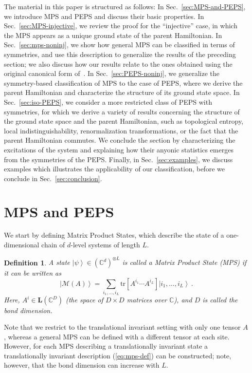 \documentclass{article}
\newcommand{\ket}[1]{\left|#1\right\rangle}
\newcommand{\tr}{\mathrm{tr}}
\newcommand{\lin}[1]{{\bm L}(\mathbb C^{#1})}
\theoremstyle{plain}
\newtheorem{definition}[lemma]{Definition}
\theoremstyle{definition}
\numberwithin{equation}{section}  %
\begin{document}
The material in this paper is structured as follows: In
Sec.~\ref{sec:MPS-and-PEPS}, we introduce MPS and PEPS and discuss their
basic properties. In Sec.~\ref{sec:MPS-injective}, we review the proof for
the ``injective'' case, in which the MPS appears as a unique ground state
of the parent Hamiltonian.  In Sec.~\ref{sec:mps-noninj}, we show how
general MPS can be classified in terms of symmetries, and use this
description to generalize the results of the preceding section; we also
discuss how our results relate to the ones obtained using the
original canonical form of~\cite{perez-garcia:mps-reps}.
In Sec.~\ref{sec:PEPS-noninj}, we generalize the
symmetry-based classification of MPS to the case of PEPS, where we derive
the parent Hamiltonian and characterize the structure of its ground state
space. In Sec.~\ref{sec:iso-PEPS}, we consider a more restricted class of
PEPS with symmetries, for which we derive a variety of results concerning the
structure of the ground state space and the parent Hamiltonian, such as
topological entropy, local indistinguishability, renormalization
transformations, or the fact that the parent Hamiltonian commutes. We
conclude the section by characterizing the excitations of the system and
explaining how their anyonic statistics emerges from the symmetries of the
PEPS. Finally, in Sec.~\ref{sec:examples}, we discuss examples which
illustrates the applicability of our classification, before we conclude in
Sec.~\ref{sec:conclusion}.




\section{MPS and PEPS\label{sec:MPS-and-PEPS}}

We start by defining Matrix Product States, which describe
the state of a one-dimensional chain of $d$-level systems of length $L$.
%
\begin{definition}
    A state $\ket\psi\in(\mathbb C^d)^{\otimes L}$
    is called a \emph{Matrix Product State (MPS)} if it
    can be written as
    \begin{equation}
        \label{eq:mps-def}
        \ket{{\mathcal{M}}(A)}=\sum_{i_1,\dots,i_L}\tr[A^{i_1}\cdots A^{i_L}]\ket{i_1,\dots,i_L}\ .
    \end{equation}
    Here, $A^{i}\in \lin{D}$ (the space of $D\times D$ matrices over $\mathbb
        C$), and $D$ is called the
    \emph{bond dimension}.
\end{definition}
Note that we restrict to the translational invariant setting with only one
tensor $A$, whereas a general MPS can be defined with a different tensor
at each site. However, for each MPS describing a translationally invariant
state a translationally invariant description (\ref{eq:mps-def}) can be
constructed; note, however, that the bond dimension can increase with $L$.
\end{document}
